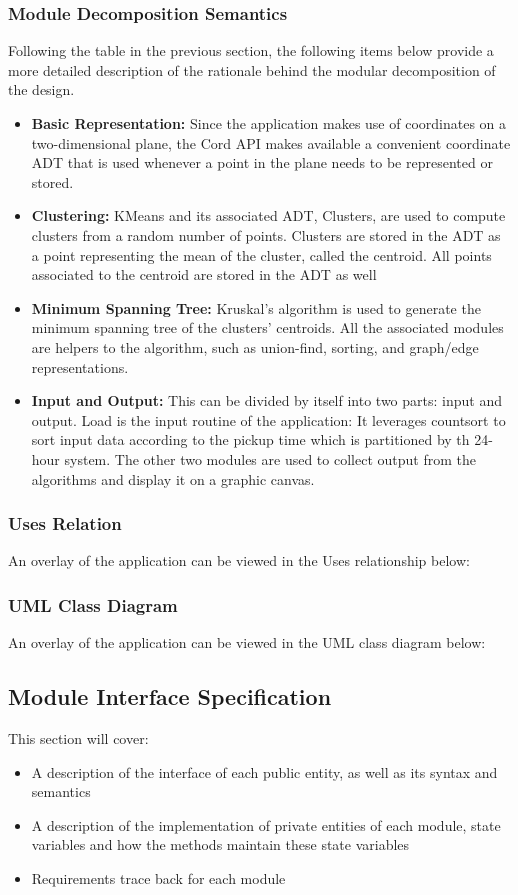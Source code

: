 \documentclass[12pt]{article}
\begin{document}
\subsubsection{Module Decomposition Semantics}
Following the table in the previous section, the following items below provide a more detailed
description of the rationale behind the modular decomposition of the design.
\begin{itemize}
\item \textbf{Basic Representation:} Since the application makes use of 
coordinates on a two-dimensional plane, the Cord API makes available a 
convenient coordinate ADT that is used whenever a point in the plane needs
to be represented or stored.
\item \textbf{Clustering:} KMeans and its associated ADT, Clusters, are used
to compute clusters from a random number of points. Clusters are stored in the
ADT as a point representing the mean of the cluster, called the centroid.
All points associated to the centroid are stored in the ADT as well
\item \textbf{Minimum Spanning Tree:} Kruskal's algorithm is used to generate
the minimum spanning tree of the clusters' centroids. All the associated modules
are helpers to the algorithm, such as union-find, sorting, and graph/edge
representations.
\item \textbf{Input and Output:} This can be divided by itself into two parts:
input and output. Load is the input routine of the application: It leverages
countsort to sort input data according to the pickup time which is 
partitioned by th 24-hour system. The other two modules are used to collect
output from the algorithms and display it on a graphic canvas.
\end{itemize}

\newpage
\subsubsection{Uses Relation}
An overlay of the application can be viewed in the Uses relationship below:

\newpage
\subsubsection{UML Class Diagram}
An overlay of the application can be viewed in the UML class diagram below:

\newpage
\subsection{Module Interface Specification}
This section will cover:
\begin{itemize}
\item A description of the interface of each public entity, as well as its syntax
and semantics
\item A description of the implementation of private entities of each module,
state variables and how the methods maintain these state variables
\item Requirements trace back for each module
\end{itemize}
\end{document}
